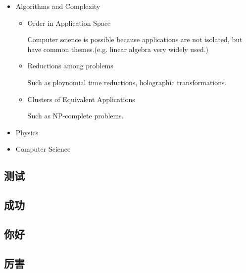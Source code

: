 \documentclass{beamer}
\begin{document}
	\begin{frame}
		\begin{itemize}
			\Large
			\item Algorithms and Complexity
			
			\begin{itemize}
				[circle]
				\item Order in Application Space
				\begin{tcolorbox}[colback = white, colframe = blue!70!red]
					Computer science is possible because applications are not isolated, but have common themes.(e.g. linear algebra very widely used.)
				\end{tcolorbox}
				
				\item Reductions among problems
				\begin{tcolorbox}[colback = white, colframe = blue!70!red]
					Such as ploynomial time reductions, holographic transformations.
				\end{tcolorbox}
				\item Clusters of Equivalent Applications
				\begin{tcolorbox}[colback = white, colframe = blue!70!red]
					Such as NP-complete problems.
				\end{tcolorbox}
			\end{itemize}
			\item  Physics
			\item  Computer Science
		\end{itemize}
	\end{frame}

	\subsection{测试}
	\subsection{成功}
	\subsection{你好}
	\subsection{厉害}
\end{document}
